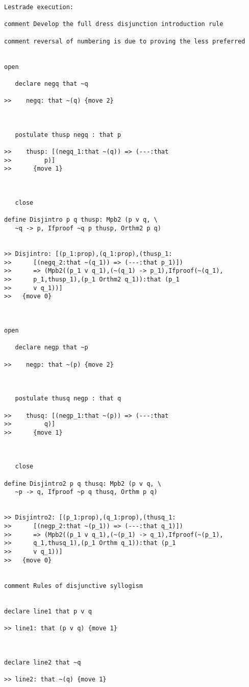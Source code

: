\documentclass[12pt]{article}
\begin{document}
\begin{verbatim}Lestrade execution:

comment Develop the full dress disjunction introduction rule

comment reversal of numbering is due to proving the less preferred


open

   declare negq that ~q

>>    negq: that ~(q) {move 2}



   postulate thusp negq : that p

>>    thusp: [(negq_1:that ~(q)) => (---:that
>>         p)]
>>      {move 1}



   close

define Disjintro p q thusp: Mpb2 (p v q, \
   ~q -> p, Ifproof ~q p thusp, Orthm2 p q)


>> Disjintro: [(p_1:prop),(q_1:prop),(thusp_1:
>>      [(negq_2:that ~(q_1)) => (---:that p_1)])
>>      => (Mpb2((p_1 v q_1),(~(q_1) -> p_1),Ifproof(~(q_1),
>>      p_1,thusp_1),(p_1 Orthm2 q_1)):that (p_1
>>      v q_1))]
>>   {move 0}



open

   declare negp that ~p

>>    negp: that ~(p) {move 2}



   postulate thusq negp : that q

>>    thusq: [(negp_1:that ~(p)) => (---:that
>>         q)]
>>      {move 1}



   close

define Disjintro2 p q thusq: Mpb2 (p v q, \
   ~p -> q, Ifproof ~p q thusq, Orthm p q)


>> Disjintro2: [(p_1:prop),(q_1:prop),(thusq_1:
>>      [(negp_2:that ~(p_1)) => (---:that q_1)])
>>      => (Mpb2((p_1 v q_1),(~(p_1) -> q_1),Ifproof(~(p_1),
>>      q_1,thusq_1),(p_1 Orthm q_1)):that (p_1
>>      v q_1))]
>>   {move 0}


comment Rules of disjunctive syllogism


declare line1 that p v q

>> line1: that (p v q) {move 1}



declare line2 that ~q

>> line2: that ~(q) {move 1}




\end{verbatim}
\end{document}
